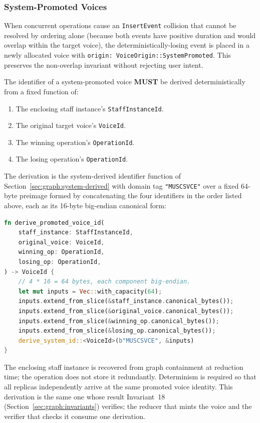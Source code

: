 \documentclass[11pt,letterpaper]{report}
\newcounter{requirement}[chapter]
\newcommand{\MUST}{\textbf{MUST}}
\begin{document}
\subsubsection{System-Promoted Voices}
\label{sec:graph:promoted-voices}

When concurrent operations cause an \texttt{InsertEvent} collision
that cannot be resolved by ordering alone (because both events
have positive duration and would overlap within the target voice),
the deterministically-losing event is placed in a newly allocated
voice with \texttt{origin: VoiceOrigin::SystemPromoted}. This
preserves the non-overlap invariant without rejecting user intent.

\begin{requirement}
  \label{req:graph:promoted-voice-id}
  The identifier of a system-promoted voice \MUST{} be derived
  deterministically from a fixed function of:

  \begin{enumerate}
    \item The enclosing staff instance's \texttt{StaffInstanceId}.
    \item The original target voice's \texttt{VoiceId}.
    \item The winning operation's \texttt{OperationId}.
    \item The losing operation's \texttt{OperationId}.
  \end{enumerate}

  The derivation is the system-derived identifier function of
  Section~\ref{sec:graph:system-derived} with domain tag
  \texttt{"MUSCSVCE"} over a fixed 64-byte preimage formed by
  concatenating the four identifiers in the order listed above, each
  as its 16-byte big-endian canonical form:

  \begin{lstlisting}[language=Rust]
fn derive_promoted_voice_id(
    staff_instance: StaffInstanceId,
    original_voice: VoiceId,
    winning_op: OperationId,
    losing_op: OperationId,
) -> VoiceId {
    // 4 * 16 = 64 bytes, each component big-endian.
    let mut inputs = Vec::with_capacity(64);
    inputs.extend_from_slice(&staff_instance.canonical_bytes());
    inputs.extend_from_slice(&original_voice.canonical_bytes());
    inputs.extend_from_slice(&winning_op.canonical_bytes());
    inputs.extend_from_slice(&losing_op.canonical_bytes());
    derive_system_id::<VoiceId>(b"MUSCSVCE", &inputs)
}
  \end{lstlisting}

  The enclosing staff instance is recovered from graph containment at
  reduction time; the operation does not store it redundantly.
  Determinism is required so that all replicas independently arrive at
  the same promoted voice identity. This derivation is the same one
  whose result Invariant~18 (Section~\ref{sec:graph:invariants})
  verifies; the reducer that mints the voice and the verifier that
  checks it consume one derivation.
\end{requirement}
\end{document}
